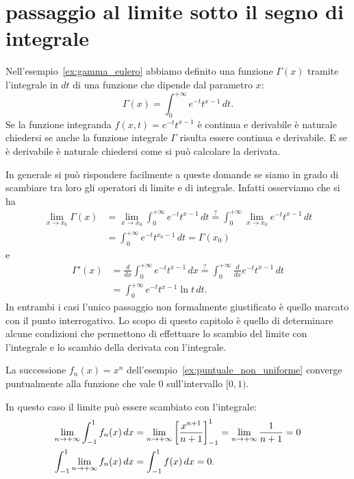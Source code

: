 \section{passaggio al limite sotto il segno di integrale}
\label{sec:scambio_integrale_limite}%

Nell'esempio~\ref{ex:gamma_eulero} abbiamo definito una 
funzione $\Gamma(x)$ tramite l'integrale in $dt$ di una funzione 
che dipende dal parametro $x$:
\[
  \Gamma(x) = \int_0^{+\infty} 
  e^{-t}t^{x-1}\, dt.
\] 
Se la funzione integranda $f(x,t)=e^{-t}t^{x-1}$ è continua e derivabile
è naturale chiedersi se anche la funzione integrale $\Gamma$ 
risulta essere continua e derivabile. 
E se è derivabile è naturale chiedersi come si può calcolare
la derivata.

In generale si può rispondere facilmente a queste domande se siamo in grado di 
scambiare tra loro gli operatori di limite e di integrale. 
Infatti osserviamo che 
si ha 
\begin{align*}
  \lim_{x\to x_0} \Gamma(x) 
  &= \lim_{x\to x_0} \int_0^{+\infty} e^{-t}t^{x-1} \, dt 
  \stackrel{?}= \int_0^{+\infty} \lim_{x\to x_0} e^{-t}t^{x-1}\, dt\\
  &= \int_0^{+\infty} e^{-t}t^{x_0-1}\, dt
  = \Gamma(x_0)
\end{align*}
e 
\begin{align*}
  \Gamma'(x) 
  &= \frac{d}{dx} \int_0^{+\infty}e^{-t}t^{x-1}\, dx
  \stackrel{?}= \int_0^{+\infty} \frac{d}{dx}e^{-t}t^{x-1}\, dt \\
  &= \int_0^{+\infty} e^{-t}t^{x-1}\ln t\, dt.
\end{align*}
In entrambi i casi l'unico passaggio non formalmente giustificato è quello marcato
con il punto interrogativo. 
Lo scopo di questo capitolo è quello di determinare alcune condizioni che permettono 
di effettuare lo scambio del limite con l'integrale e lo scambio della derivata con l'integrale.


\begin{example}%
La successione $f_n(x)=x^n$ dell'esempio~\ref{ex:puntuale_non_uniforme}
converge puntualmente alla funzione che vale $0$ sull'intervallo $[0,1)$.

In questo caso il limite può essere scambiato con l'integrale:
\begin{align*}
\lim_{n\to +\infty} \int_{-1}^1 f_n(x)\, dx 
&= \lim_{n\to+\infty} {\left[ \frac{x^{n+1}}{n+1} \right]}_{-1}^1
 = \lim_{n\to+\infty} \frac{1}{n+1} = 0 \\
\int_{-1}^1 \lim_{n\to+\infty} f_n(x)\, dx 
&= \int_{-1}^1 f(x)\, dx = 0.
\end{align*}
\end{example}

